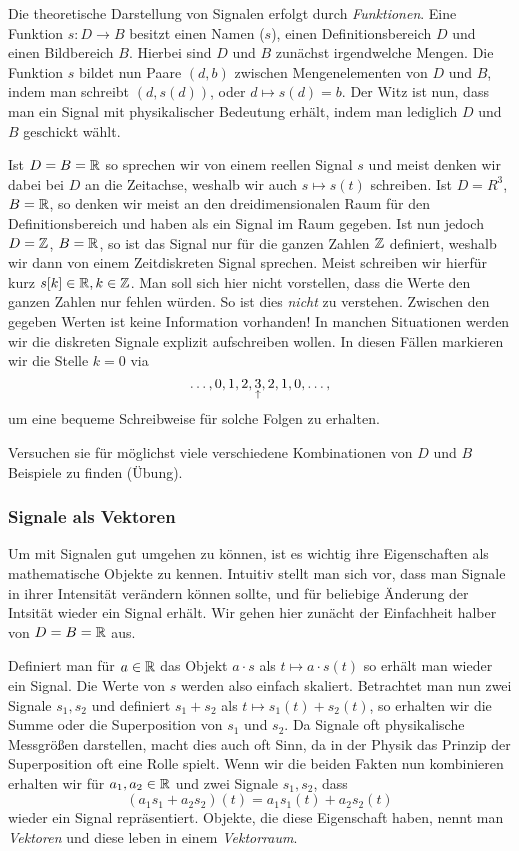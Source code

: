 Die theoretische Darstellung von Signalen erfolgt durch \emph{Funktionen}.
Eine Funktion $s : D \rightarrow B$ besitzt einen Namen ($s$), einen Definitionsbereich $D$ und einen Bildbereich $B$.
Hierbei sind $D$ und $B$ zun\"achst irgendwelche Mengen. 
Die Funktion $s$ bildet nun Paare $(d,b)$ zwischen Mengenelementen von $D$ und $B$, indem man schreibt $(d, s(d))$, oder $d \mapsto s(d) = b$.
Der Witz ist nun, dass man ein Signal mit physikalischer Bedeutung erh\"alt, indem man lediglich $D$ und $B$ geschickt w\"ahlt.

Ist $D = B = \mathbb{R}$ so sprechen wir von einem reellen Signal $s$ und meist denken wir dabei bei $D$ an die Zeitachse, weshalb wir auch $s \mapsto s(t)$ schreiben. 
Ist $D = R^3$, $B = \mathbb{R}$, so denken wir meist an den dreidimensionalen Raum f\"ur den Definitionsbereich und haben als ein Signal im Raum gegeben.
Ist nun jedoch $D = \mathbb{Z}$, $B = \mathbb{R}$, so ist das Signal nur f\"ur die ganzen Zahlen $\mathbb{Z}$ definiert, weshalb wir dann von einem Zeitdiskreten Signal sprechen.
Meist schreiben wir hierf\"ur kurz $s[k] \in \mathbb{R}, k\in \mathbb{Z}$.
Man soll sich hier nicht vorstellen, dass die Werte  den ganzen Zahlen nur fehlen w\"urden. 
So ist dies \emph{nicht} zu verstehen. 
Zwischen den gegeben Werten ist keine Information vorhanden!
In manchen Situationen werden wir die diskreten Signale explizit aufschreiben wollen. 
In diesen F\"allen markieren wir die Stelle $k = 0$ via
\[
\dots, 0, 1, 2, \underset{\uparrow}{3}, 2, 1, 0, \dots,
\]
um eine bequeme Schreibweise f\"ur solche Folgen zu erhalten. 

Versuchen sie f\"ur m\"oglichst viele verschiedene Kombinationen von $D$ und $B$ Beispiele zu finden (\"Ubung).
%
\subsubsection{Signale als Vektoren}\label{sec:signals_vec}
%
Um mit Signalen gut umgehen zu k\"onnen, ist es wichtig ihre Eigenschaften als mathematische Objekte zu kennen.
Intuitiv stellt man sich vor, dass man Signale in ihrer Intensit\"at ver\"andern k\"onnen sollte, und f\"ur beliebige \"Anderung der Intsit\"at wieder ein Signal erh\"alt.
Wir gehen hier zun\"acht der Einfachheit halber von $D = B = \mathbb{R}$ aus.

Definiert man f\"ur $a \in \mathbb{R}$ das Objekt $a \cdot s$ als $t \mapsto a \cdot s(t)$ so erh\"alt man wieder ein Signal.
Die Werte von $s$ werden also einfach skaliert.
Betrachtet man nun zwei Signale $s_1, s_2$ und definiert $s_1 + s_2$ als $t \mapsto s_1(t) + s_2(t)$, so erhalten wir die Summe oder die Superposition von $s_1$ und $s_2$.
Da Signale oft physikalische Messgr\"o\ss{}en darstellen, macht dies auch oft Sinn, da in der Physik das Prinzip der Superposition oft eine Rolle spielt.
Wenn wir die beiden Fakten nun kombinieren erhalten wir f\"ur $a_1, a_2 \in \mathbb{R}$ und zwei Signale $s_1, s_2$, dass
\[
(a_1 s_1 + a_2 s_2)(t) = a_1 s_1(t) + a_2 s_2(t)
\]
wieder ein Signal repr\"asentiert.
Objekte, die diese Eigenschaft haben, nennt man \emph{Vektoren} und diese leben in einem \emph{Vektorraum}.

